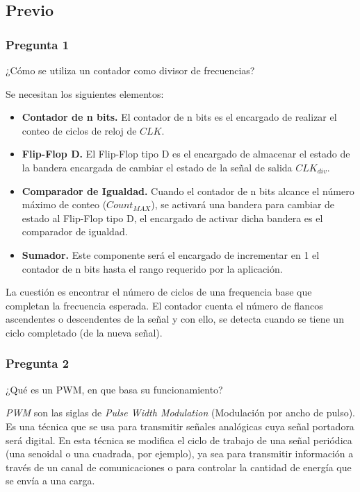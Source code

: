 \documentclass[../procedimientos.tex]{subfiles}
\begin{document}
\subsection{Previo} \label{subs:previo}
\subsubsection*{Pregunta 1}
\begin{em}
  ¿Cómo se utiliza un contador como divisor de frecuencias?
\end{em}

Se necesitan los siguientes elementos:
\begin{itemize}
  \item \textbf{Contador de n bits.} El contador de n bits es el encargado de 
    realizar el conteo de ciclos de reloj de $CLK$.
  \item \textbf{Flip-Flop D.} El Flip-Flop tipo D es el encargado de almacenar 
    el estado de la bandera encargada de cambiar el estado de la señal de salida 
    $CLK_{div}$.
  \item \textbf{Comparador de Igualdad.} Cuando el contador de n bits alcance 
    el número máximo de conteo ($Count_{MAX}$), se activará una bandera para 
    cambiar de estado al Flip-Flop tipo D, el encargado de activar dicha 
    bandera es el comparador de igualdad.
  \item \textbf{Sumador.} Este componente será el encargado de incrementar en 1 el contador de n 
    bits hasta el rango requerido por la aplicación.
\end{itemize}

La cuestión es encontrar el número de ciclos de una frequencia base que 
completan la frecuencia esperada. El contador cuenta el número de flancos 
ascendentes o descendentes de la señal y con ello, se detecta cuando se 
tiene un ciclo completado (de la nueva señal).

\subsubsection*{Pregunta 2}
\begin{em}
  ¿Qué es un PWM, en que basa su funcionamiento?
\end{em}

\textit{PWM} son las siglas de \textit{Pulse Width Modulation} (Modulación por 
ancho de pulso). Es una técnica que se usa para transmitir señales analógicas 
cuya señal portadora será digital. En esta técnica se modifica el ciclo de 
trabajo de una señal periódica (una senoidal o una cuadrada, por ejemplo), ya 
sea para transmitir información a través de un canal de comunicaciones o para 
controlar la cantidad de energía que se envía a una carga.
\end{document}
